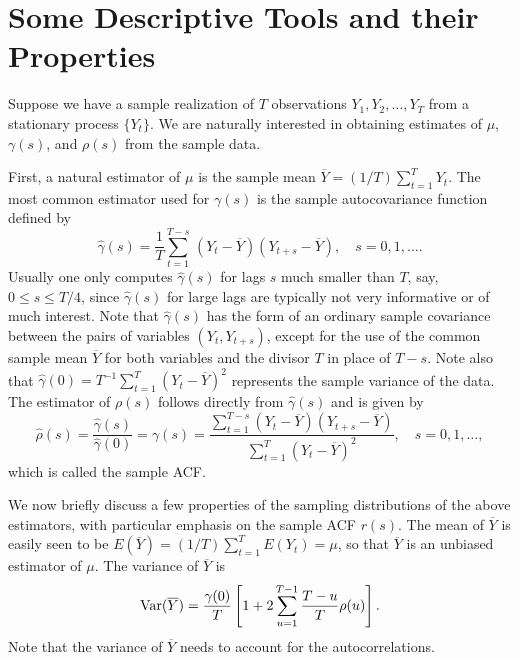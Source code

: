 \section{Some Descriptive Tools and their Properties} 


Suppose we have a sample realization of $T$ observations $Y_1, Y_2, \ldots, Y_T$ from a stationary process $\{Y_t\}$. We are naturally interested in obtaining estimates of $\mu$, $\gamma(s)$, and $\rho(s)$ from the sample data.


First, a natural estimator of $\mu$ is the sample mean $\overline{Y}= (1/T) \sum_{t=1}^T Y_t$. The most common estimator used for $\gamma(s)$ is the sample autocovariance function defined by
	\[
	\hat{\gamma}(s)= \frac{1}{T} \sum_{t=1}^{T-s} \, \left(Y_{t}-\overline{Y}\right) \left(Y_{t+s}-\overline{Y}\right), \quad s=0, 1, \ldots.
	\]
Usually one only computes $\hat{\gamma}(s)$ for lags $s$ much smaller than $T$, say, $0 \leq s \leq T/4$, since $\hat{\gamma}(s)$ for large lags are typically not very informative or of much interest. Note that $\hat{\gamma}(s)$ has the form of an ordinary sample covariance between the pairs of variables $(Y_t, Y_{t+s})$, except for the use of the common sample mean $\overline{Y}$ for both variables and the divisor $T$ in place of $T-s$.  Note also that $\hat{\gamma}(0) = T^{-1}\sum_{t=1}^T (Y_t-\overline{Y})^2$ represents the sample variance of the data.  The estimator of $\rho(s)$ follows directly from $\hat{\gamma}(s)$ and is given by
	\begin{equation} \label{eqn:hatrho}
         \hat{\rho}(s)= \frac{\hat{\gamma}(s)}{\hat{\gamma}(0)}= \gamma(s)= \frac{\sum_{t=1}^{T-s} \left(Y_{t}-\overline{Y}\right) \left(Y_{t+s}-\overline{Y}\right)}{\sum_{t=1}^T(Y_t-\overline{Y})^2} , \quad s= 0, 1, \ldots,
	\end{equation}
which is called the sample ACF.  


We now briefly discuss a few properties of the sampling distributions of the above estimators, with particular emphasis on the sample ACF $r(s)$.  The mean of $\overline{Y}$ is easily seen to be $E(\overline{Y})= (1/T) \sum_{t=1}^T E(Y_t) = \mu$, so that $\overline{Y}$ is an unbiased estimator of $\mu$.  The variance of $\overline{Y}$ is
	\begin{equation} \label{eqn:var}
        \var(\overline{Y})= \frac{\gamma(0)}{T} \left[ 1 + 2 \sum_{u=1}^{T-1} \frac{T - u}{T} \rho(u) \right].
        \end{equation}
Note that the variance of $\overline{Y}$ needs to account for the autocorrelations. 


